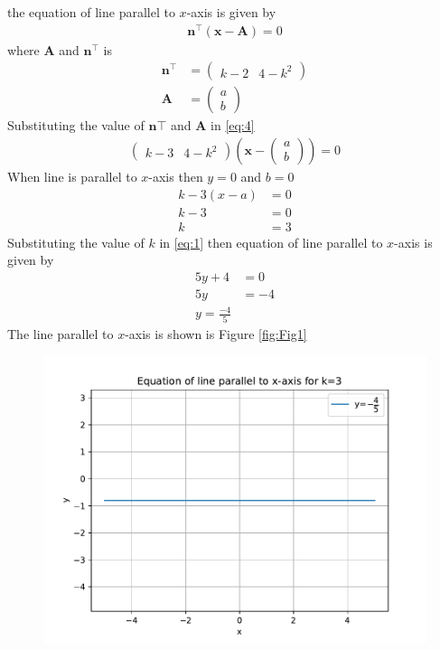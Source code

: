 \documentclass[12pt]{article}
\providecommand{\brak}[1]{\ensuremath{\left(#1\right)}}
\newcommand{\myvec}[1]{\ensuremath{\begin{pmatrix}#1\end{pmatrix}}}
\let\vec\mathbf
\begin{document}
\begin{enumerate}
\begin{enumerate}
the equation of line parallel to $x$-axis is given by
\begin{align}
\vec{n}^\top\brak{\vec{x}-\vec{A}}=0 \label{eq:4}
\end{align}
where $\vec{A}$ and $\vec{n}^\top$ is
\begin{align}
\vec{n}^\top &=\myvec{k-2 & 4-k^2}\\
\vec{A} &=\myvec{a\\b}
\end{align}
Substituting the value of $\vec{n}\top$ and $\vec{A}$ in \eqref{eq:4}
\begin{align}
\myvec{k-3 & 4-k^2}\brak{\vec{x}-\myvec{a\\b}} =0
\end{align}
When line is parallel to $x$-axis then $y=0$ and $b=0$
\begin{align}
        k-3 \brak{x-a} &=0\\
        k-3 &=0\\
        k &=3
\end{align}
Substituting the value of $k$ in \eqref{eq:1} then equation of line parallel to $x$-axis is given by
\begin{align}
        5y+4 &=0\\
        5y &=-4\\
        y=\frac{-4}{5}
\end{align}
The line parallel to $x$-axis is shown is Figure \eqref{fig:Fig1}

\begin{figure}[!h]
\begin{center}
\includegraphics[width=\columnwidth]{figs/fig1.pdf}
\end{center}
\caption{}
\label{fig:Fig1}
\end{figure}


\end{enumerate}
\end{enumerate}
\end{document}
